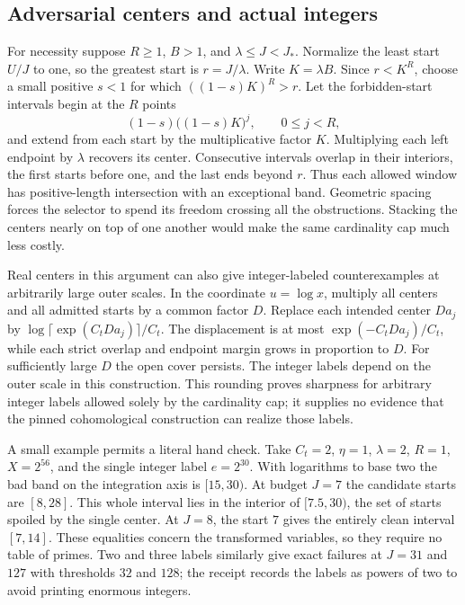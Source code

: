 \documentclass[12pt,letterpaper]{article}
\begin{document}
\subsection{Adversarial centers and actual integers}
For necessity suppose \(R\ge1\), \(B>1\), and \(\lambda\le J<J_*\). Normalize the least start \(U/J\) to one, so the greatest start is \(r=J/\lambda\). Write \(K=\lambda B\). Since \(r<K^R\), choose a small positive \(s<1\) for which \(((1-s)K)^R>r\). Let the forbidden-start intervals begin at the \(R\) points
\[
           (1-s)\bigl((1-s)K\bigr)^j,
               \qquad 0\le j<R,
\]
and extend from each start by the multiplicative factor \(K\). Multiplying each left endpoint by \(\lambda\) recovers its center. Consecutive intervals overlap in their interiors, the first starts before one, and the last ends beyond \(r\). Thus each allowed window has positive-length intersection with an exceptional band. Geometric spacing forces the selector to spend its freedom crossing all the obstructions. Stacking the centers nearly on top of one another would make the same cardinality cap much less costly.

Real centers in this argument can also give integer-labeled counterexamples at arbitrarily large outer scales. In the coordinate \(u=\log x\), multiply all centers and all admitted starts by a common factor \(D\). Replace each intended center \(Da_j\) by \(\log\lceil\exp(C_tDa_j)\rceil/C_t\). The displacement is at most \(\exp(-C_tDa_j)/C_t\), while each strict overlap and endpoint margin grows in proportion to \(D\). For sufficiently large \(D\) the open cover persists. The integer labels depend on the outer scale in this construction. This rounding proves sharpness for arbitrary integer labels allowed solely by the cardinality cap; it supplies no evidence that the pinned cohomological construction can realize those labels.

A small example permits a literal hand check. Take \(C_t=2\), \(\eta=1\), \(\lambda=2\), \(R=1\), \(X=2^{56}\), and the single integer label \(e=2^{30}\). With logarithms to base two the bad band on the integration axis is \([15,30)\). At budget \(J=7\) the candidate starts are \([8,28]\). This whole interval lies in the interior of \([7.5,30)\), the set of starts spoiled by the single center. At \(J=8\), the start \(7\) gives the entirely clean interval \([7,14]\). These equalities concern the transformed variables, so they require no table of primes. Two and three labels similarly give exact failures at \(J=31\) and \(127\) with thresholds \(32\) and \(128\); the receipt records the labels as powers of two to avoid printing enormous integers.
\end{document}
